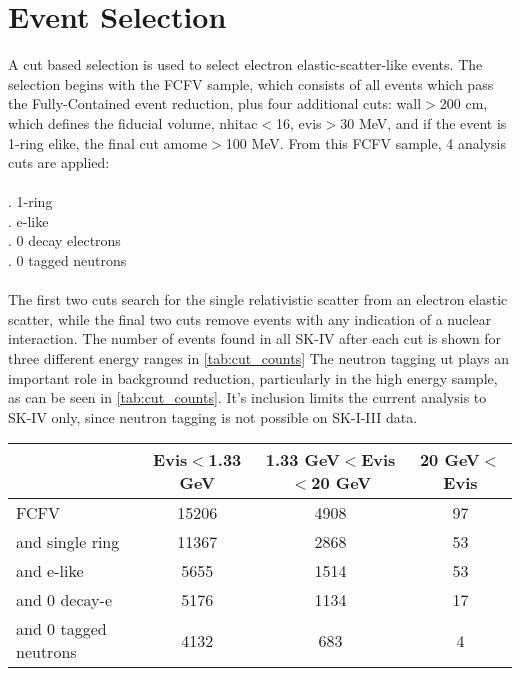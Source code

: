 \section{Event Selection}
\label{sec:event_selection}
A cut based selection is used to select electron elastic-scatter-like events.  The selection begins with the FCFV sample, which consists of all events which pass the Fully-Contained event reduction, plus four additional cuts: wall$>$200 cm, which defines the fiducial volume, nhitac$<$16, evis$>$30 MeV, and if the event is 1-ring elike, the final cut amome$>$100 MeV.  From this FCFV sample, 4 analysis cuts are applied: \\
\\
. 1-ring\\
. e-like\\
. 0 decay electrons\\
. 0 tagged neutrons\\
\\
 
The first two cuts search for the single relativistic scatter from an electron elastic scatter, while the final two cuts remove events with any indication of a nuclear interaction.  The number of events found in all SK-IV after each cut is shown for three different energy ranges in \ref{tab:cut_counts}   The neutron tagging ut plays an important role in background reduction, particularly in the high energy sample, as can be seen in \cref{tab:cut_counts}.  It's inclusion limits the current analysis to SK-IV only, since neutron tagging is not possible on SK-I-III data.
\begin{table*}
\begin{tabular}{lccc}
\hline \hline
& Evis$<$1.33 GeV & 1.33 GeV$<$Evis$<$20 GeV & 20 GeV$<$ Evis \\
\hline
FCFV & 15206 & 4908 & 97 \\
and single ring & 11367 & 2868 & 53 \\
and e-like & 5655 & 1514 & 53 \\
and 0 decay-e & 5176 & 1134 & 17 \\
and 0 tagged neutrons & 4132 & 683 & 4 \\
\hline 
\end{tabular}
\caption{Number of events in SK4 data passing each cut for 3 energy ranges.}
\label{tab:cut_counts}
\end{table*}
